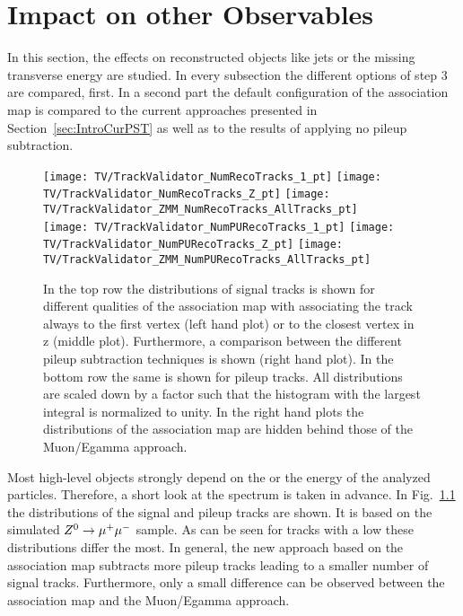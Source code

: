 \chapter{Impact on other Observables \label{sec:OO}}

In this section, the effects on reconstructed objects like jets or the missing transverse energy are studied. In every subsection the different options of step 3 are compared, first. In a second part the default configuration of the association map is compared to the current approaches presented in Section~\ref{sec:IntroCurPST} as well as to the results of applying no pileup subtraction.

\begin{figure}[Hb]
    \centering
    \texttt{[image: TV/TrackValidator\_NumRecoTracks\_1\_pt]}
    \texttt{[image: TV/TrackValidator\_NumRecoTracks\_Z\_pt]}
    \texttt{[image: TV/TrackValidator\_ZMM\_NumRecoTracks\_AllTracks\_pt]}
    \\
    \texttt{[image: TV/TrackValidator\_NumPURecoTracks\_1\_pt]}
    \texttt{[image: TV/TrackValidator\_NumPURecoTracks\_Z\_pt]}
    \texttt{[image: TV/TrackValidator\_ZMM\_NumPURecoTracks\_AllTracks\_pt]}
    \caption[Distribution of the transverse momentum of signal and pileup tracks for different qualities of the association map and different pileup subtraction techniques ]{In the top row the \pt distributions of signal tracks is shown for different qualities of the association map with associating the track always to the first vertex (left hand plot) or to the closest vertex in z (middle plot). Furthermore, a comparison between the different pileup subtraction techniques is shown (right hand plot). In the bottom row the same is shown for pileup tracks. All distributions are scaled down by a factor such that the histogram with the largest integral is normalized to unity. In the right hand plots the distributions of the association map are hidden behind those of the Muon/Egamma approach. \label{plot:OOTrackPt}}
\end{figure}


Most high-level objects strongly depend on the \pt or the energy of the analyzed particles. Therefore, a short look at the \pt spectrum is taken in advance. In Fig.~\ref{plot:OOTrackPt} the \pt distributions of the signal and pileup tracks are shown. It is based on the simulated ${Z^{0}}\rightarrow\mu^+\mu^-$ sample. As can be seen for tracks with a low \pt these distributions differ the most. In general, the new approach based on the association map subtracts more pileup tracks leading to a smaller number of signal tracks. Furthermore, only a small difference can be observed between the association map and the Muon/Egamma approach.

